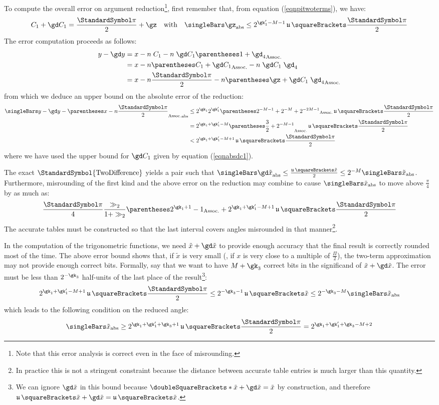 \documentclass[10pt, a4paper, twoside]{basestyle}
\DeclareMathOperator{\ULP}{\mathfrak u}
\DeclareMathOperator{\twodifference}{\StandardSymbol{TwoDifference}}
\newcommand{\round}[1]{\doubleSquareBrackets*{#1}}
\newcommand{\red}[1]{\tilde{#1}}
\begin{document}
To compute the overall error on argument reduction\footnote{Note that this error analysis is correct even in the face of misrounding.}, first remember that, from equation (\ref{eqnpitwoterms}), we have:
\[
C_1 + \gd C_1 = \frac{\Pi}{2} + \gz \quad \text{with} \quad \abs{\gz} \leq 2^{\gk'_1 - M - 1} \ULP\of{\frac{\Pi}{2}}
\]
The error computation proceeds as follows:
\begin{align*}
y - \gd y &= x - n \; C_1 - n \; \gd C_1 \pa{1 + \gd_4} \\
&= x - n \pa{C_1 + \gd C_1} - n \; \gd C_1 \; \gd_4 \\
&= x - n \frac{\Pi}{2} - n \pa{\gz + \gd C_1 \; \gd_4}
\end{align*}
from which we deduce an upper bound on the absolute error of the reduction:
\begin{align*}
\abs{y - \gd y - \pa{x - n \frac{\Pi}{2}}} &\leq 2^{\gk_1} 2^{\gk'_1} \pa{2^{- M - 1} + 2^{-M} + 2^{-2 M - 1}} \ULP\of{\frac{\Pi}{2}} \\
&= 2^{\gk_1 + \gk'_1 - M}\pa{\frac{3}{2} + 2^{-M - 1}} \ULP\of{\frac{\Pi}{2}} \\
&< 2^{\gk_1 + \gk'_1 - M + 1} \ULP\of{\frac{\Pi}{2}}
\end{align*}
where we have used the upper bound for $\gd C_1$ given by equation (\ref{eqnabsdc1}).

The exact $\twodifference$ yields a pair such that $\abs{\gd \red x} \le \frac{\ULP\of{\red x}}{2} \le 2^{-M} \abs{\red x}$.  Furthermore, misrounding of the first kind and the above error on the reduction may combine to cause $\abs{\red x}$ to move above $\frac{\pi}{4}$ by as much as:
\[
\frac{\Pi}{4} \frac{\gg_2}{1 + \gg_2} \pa{2^{\gk_1 + 1} - 1} + 2^{\gk_1 + \gk'_1 - M + 1} \ULP\of{\frac{\Pi}{2}}
\]
The accurate tables must be constructed so that the last interval covers angles misrounded in that manner\footnote{In practice this is not a stringent constraint because the distance between accurate table entries is much larger than this quantity.}.

In the computation of the trigonometric functions, we need $\red x + \gd \red x$ to provide enough accuracy that the final result is correctly rounded most of the time.  The above error bound shows that, if $\red x$ is very small (\idest, if $x$ is very close to a multiple of $\frac{\Pi}{2}$), the two-term approximation may not provide enough correct bits.  Formally, say that we want to have $M + \gk_3$ correct bits in the significand of $\red x + \gd \red x$.  The error must be less than $2^{-\gk_3}$ half-units of the last place of the result\footnote{We can ignore $\gd \red x$ in this bound because $\round{\red x + \gd \red x} = \red x$ by construction, and therefore $\ULP\of{\red x + \gd \red x} = \ULP\of{\red x}$.}:
\begin{equation}
2^{\gk_1 + \gk'_1 - M + 1} \ULP\of{\frac{\Pi}{2}} \leq 2^{-\gk_3 - 1} \ULP\of{\red x} \leq 2^{-\gk_3 - M} \abs{\red x}
\label{eqnreductionbound}
\end{equation}
which leads to the following condition on the reduced angle:
\[
\abs{\red x} \geq 2^{\gk_1 + \gk'_1 + \gk_3 + 1} \ULP\of{\frac{\Pi}{2}} = 2^{\gk_1 + \gk'_1 + \gk_3 - M + 2}
\]
\end{document}
